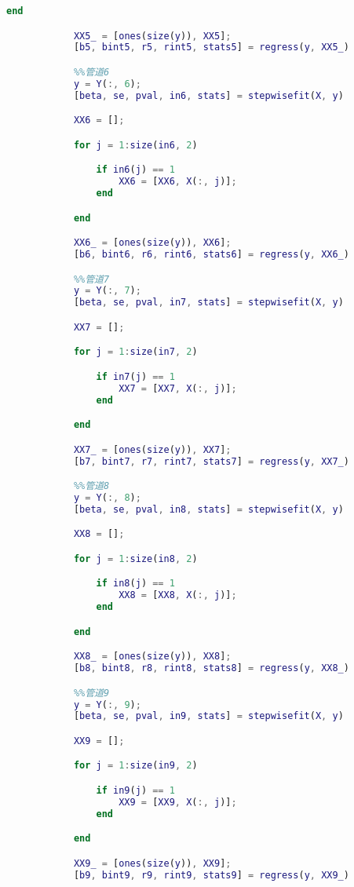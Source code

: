 \begin{appendices}
\begin{lstlisting}[language=matlab]
            end

            XX5_ = [ones(size(y)), XX5];
            [b5, bint5, r5, rint5, stats5] = regress(y, XX5_)

            %%管道6
            y = Y(:, 6);
            [beta, se, pval, in6, stats] = stepwisefit(X, y)

            XX6 = [];

            for j = 1:size(in6, 2)

                if in6(j) == 1
                    XX6 = [XX6, X(:, j)];
                end

            end

            XX6_ = [ones(size(y)), XX6];
            [b6, bint6, r6, rint6, stats6] = regress(y, XX6_)

            %%管道7
            y = Y(:, 7);
            [beta, se, pval, in7, stats] = stepwisefit(X, y)

            XX7 = [];

            for j = 1:size(in7, 2)

                if in7(j) == 1
                    XX7 = [XX7, X(:, j)];
                end

            end

            XX7_ = [ones(size(y)), XX7];
            [b7, bint7, r7, rint7, stats7] = regress(y, XX7_)

            %%管道8
            y = Y(:, 8);
            [beta, se, pval, in8, stats] = stepwisefit(X, y)

            XX8 = [];

            for j = 1:size(in8, 2)

                if in8(j) == 1
                    XX8 = [XX8, X(:, j)];
                end

            end

            XX8_ = [ones(size(y)), XX8];
            [b8, bint8, r8, rint8, stats8] = regress(y, XX8_)

            %%管道9
            y = Y(:, 9);
            [beta, se, pval, in9, stats] = stepwisefit(X, y)

            XX9 = [];

            for j = 1:size(in9, 2)

                if in9(j) == 1
                    XX9 = [XX9, X(:, j)];
                end

            end

            XX9_ = [ones(size(y)), XX9];
            [b9, bint9, r9, rint9, stats9] = regress(y, XX9_)


\end{lstlisting}
\end{appendices}
